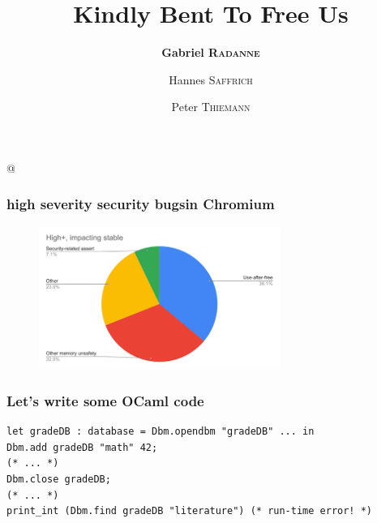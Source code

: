 \documentclass[aspectratio=169,dvipsnames,svgnames,10pt]{beamer}
\title{Kindly Bent To Free Us}
\author{\textbf{Gabriel \textsc{Radanne}}
  \and Hannes \textsc{Saffrich}
  \and Peter \textsc{Thiemann}}
\begin{document}
\lstMakeShortInline[keepspaces,basicstyle=\small\ttfamily]@

\frame[plain]{\titlepage}


\begin{frame}
  \frametitle{\og high severity security bugs\fg in Chromium}

  \begin{figure}[h]
    \centering
    \includegraphics[width=0.7\textwidth]
    {chromium-use-after-free}
  \end{figure}

  
\end{frame}

\begin{frame}[fragile]
  \frametitle{Let's write some OCaml code}

\begin{verbatim}
let gradeDB : database = Dbm.opendbm "gradeDB" ... in
Dbm.add gradeDB "math" 42;
(* ... *)
Dbm.close gradeDB;
(* ... *)
print_int (Dbm.find gradeDB "literature") (* run-time error! *)
\end{verbatim}
  
\end{frame}
\end{document}
